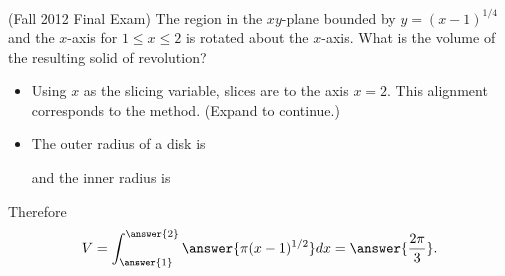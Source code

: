 \documentclass{ximera}
\begin{document}
\begin{example}
(Fall 2012 Final Exam) The region in the $xy$-plane bounded by $y = (x-1)^{1/4}$ and the $x$-axis for $1 \leq x \leq 2$ is rotated about the $x$-axis. What is the volume of the resulting solid of revolution?
\begin{itemize}
\item Using $x$ as the slicing variable, slices are  to the axis $x=2$. This alignment corresponds to the  method.
(Expand to continue.)
\end{itemize}
\begin{expandable}
\begin{itemize}
\item The outer radius of a disk is 
\begin{multipleChoice}
\end{multipleChoice}
and the inner radius is
\begin{multipleChoice}
\end{multipleChoice}
\end{itemize}
Therefore
\[ V = \int_{\answer{1}}^{\answer{2}} \answer{\pi (x-1)^{1/2}} dx = \answer{\frac{2 \pi}{3}}. \]
\end{expandable}
\end{example}
\end{document}
